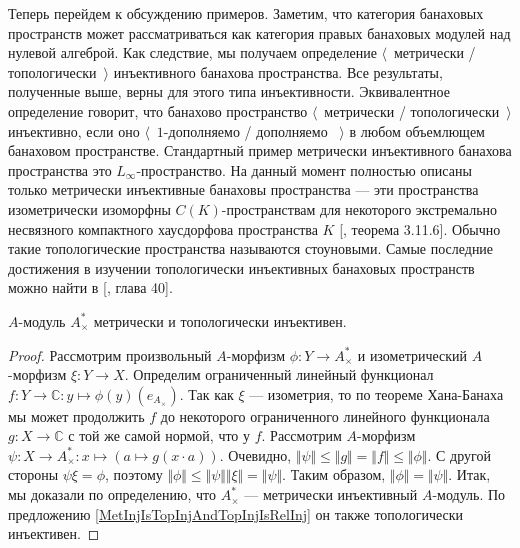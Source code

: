Теперь перейдем к обсуждению примеров. Заметим, что категория банаховых пространств может рассматриваться как категория правых банаховых модулей над нулевой алгеброй. Как следствие, мы получаем определение $\langle$~метрически / топологически~$\rangle$ инъективного банахова пространства. Все результаты, полученные выше, верны для этого типа инъективности. Эквивалентное определение говорит, что банахово пространство $\langle$~метрически / топологически~$\rangle$ инъективно, если оно $\langle$~$1$-дополняемо / дополняемо ~$\rangle$ в любом объемлющем банаховом пространстве. Стандартный пример метрически инъективного банахова пространства это $L_\infty$-пространство. На данный момент полностью описаны только метрически инъективные банаховы пространства --- эти пространства изометрически изоморфны $C(K)$-пространствам для некоторого экстремально несвязного компактного хаусдорфова пространства $K$ [\cite{LaceyIsomThOfClassicBanSp}, теорема 3.11.6]. Обычно такие топологические пространства называются стоуновыми. Самые последние достижения в изучении топологически инъективных банаховых пространств можно найти в [\cite{JohnLinHandbookGeomBanSp}, глава 40].

\begin{proposition}\label{DualOfUnitalAlgIsMetTopInj} $A$-модуль $A_\times^*$ метрически и топологически инъективен. 
\end{proposition}
\begin{proof} Рассмотрим произвольный $A$-морфизм $\phi:Y\to A_\times^*$ и изометрический $A$-морфизм $\xi:Y\to X$. Определим ограниченный линейный функционал $f:Y\to\mathbb{C}:y\mapsto \phi(y)(e_{A_\times})$. Так как $\xi$ --- изометрия, то по теореме Хана-Банаха мы может продолжить $f$ до некоторого ограниченного линейного функционала $g:X\to\mathbb{C}$ с той же самой нормой, что у $f$. Рассмотрим $A$-морфизм $\psi:X\to A_\times^*:x\mapsto (a\mapsto g(x\cdot a))$. Очевидно, $\Vert\psi\Vert\leq\Vert g\Vert=\Vert f\Vert\leq\Vert\phi\Vert$. С другой стороны $\psi\xi=\phi$, поэтому $\Vert\phi\Vert\leq\Vert\psi\Vert\Vert\xi\Vert=\Vert\psi\Vert$. Таким образом, $\Vert\phi\Vert=\Vert\psi\Vert$. Итак, мы доказали по определению, что $A_\times^*$ --- метрически инъективный $A$-модуль. По предложению \ref{MetInjIsTopInjAndTopInjIsRelInj} он также топологически инъективен.
\end{proof}

